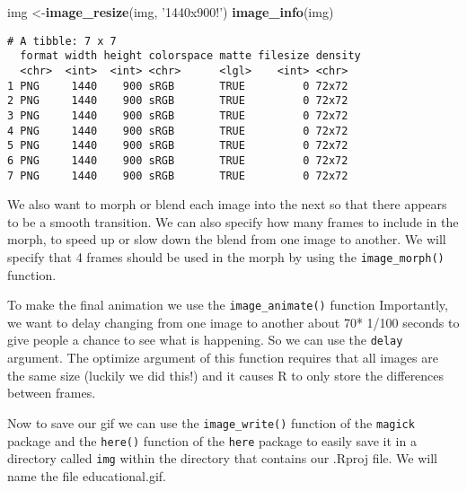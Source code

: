 \documentclass[
]{article}
\newenvironment{Shaded}{\begin{snugshade}}{\end{snugshade}}
\newcommand{\DataTypeTok}[1]{\textcolor[rgb]{0.13,0.29,0.53}{#1}}
\newcommand{\DecValTok}[1]{\textcolor[rgb]{0.00,0.00,0.81}{#1}}
\newcommand{\KeywordTok}[1]{\textcolor[rgb]{0.13,0.29,0.53}{\textbf{#1}}}
\newcommand{\NormalTok}[1]{#1}
\newcommand{\OperatorTok}[1]{\textcolor[rgb]{0.81,0.36,0.00}{\textbf{#1}}}
\newcommand{\OtherTok}[1]{\textcolor[rgb]{0.56,0.35,0.01}{#1}}
\newcommand{\StringTok}[1]{\textcolor[rgb]{0.31,0.60,0.02}{#1}}
\begin{document}
\begin{Shaded}
\begin{Highlighting}[]
\NormalTok{img <-}\KeywordTok{image_resize}\NormalTok{(img, }\StringTok{'1440x900!'}\NormalTok{)}
\KeywordTok{image_info}\NormalTok{(img)}
\end{Highlighting}
\end{Shaded}

\begin{verbatim}
# A tibble: 7 x 7
  format width height colorspace matte filesize density
  <chr>  <int>  <int> <chr>      <lgl>    <int> <chr>  
1 PNG     1440    900 sRGB       TRUE         0 72x72  
2 PNG     1440    900 sRGB       TRUE         0 72x72  
3 PNG     1440    900 sRGB       TRUE         0 72x72  
4 PNG     1440    900 sRGB       TRUE         0 72x72  
5 PNG     1440    900 sRGB       TRUE         0 72x72  
6 PNG     1440    900 sRGB       TRUE         0 72x72  
7 PNG     1440    900 sRGB       TRUE         0 72x72  
\end{verbatim}

We also want to morph or blend each image into the next so that there
appears to be a smooth transition. We can also specify how many frames
to include in the morph, to speed up or slow down the blend from one
image to another. We will specify that 4 frames should be used in the
morph by using the \texttt{image\_morph()} function.

To make the final animation we use the \texttt{image\_animate()}
function Importantly, we want to delay changing from one image to
another about 70* 1/100 seconds to give people a chance to see what is
happening. So we can use the \texttt{delay} argument. The optimize
argument of this function requires that all images are the same size
(luckily we did this!) and it causes R to only store the differences
between frames.

\begin{Shaded}
\end{Shaded}

Now to save our gif we can use the \texttt{image\_write()} function of
the \texttt{magick} package and the \texttt{here()} function of the
\texttt{here} package to easily save it in a directory called
\texttt{img} within the directory that contains our .Rproj file. We will
name the file educational.gif.
\end{document}
